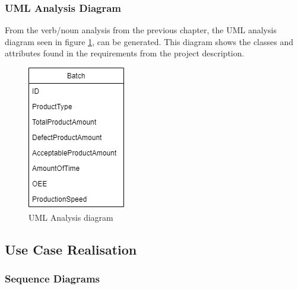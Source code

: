 \subsubsection{UML Analysis Diagram}
From the verb/noun analysis from the previous chapter, the UML analysis diagram
seen in figure \ref{figure:analysis_diagram}, can be generated. This diagram
shows the classes and attributes found in the requirements from the project
description.

\begin{figure}[ht]
	\centering 
	\includegraphics[scale=0.6]{images/diagrams/UML_Analysis_Diagram.drawio.png}
	\caption{UML Analysis diagram}
	\label{figure:analysis_diagram} 
\end{figure}

\subsection{Use Case Realisation}

\subsubsection{Sequence Diagrams}


